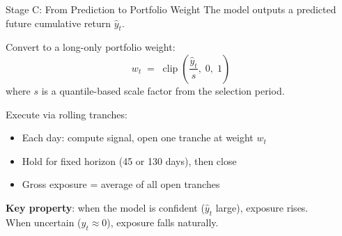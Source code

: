 \documentclass[aspectratio=169]{beamer}
\begin{document}
\begin{frame}{Stage C: From Prediction to Portfolio Weight}
  The model outputs a predicted future cumulative return \(\hat{y}_t\).

  \vspace{0.6em}
  Convert to a long-only portfolio weight:
  \[
    w_t \;=\; \operatorname{clip}\!\left(\frac{\hat{y}_t}{s},\; 0,\; 1\right)
  \]
  where \(s\) is a quantile-based scale factor from the selection period.

  \vspace{0.6em}
  Execute via rolling tranches:
  \begin{itemize}
    \item Each day: compute signal, open one tranche at weight \(w_t\)
    \item Hold for fixed horizon (45 or 130 days), then close
    \item Gross exposure = average of all open tranches
  \end{itemize}

  \vspace{0.5em}
  \textbf{Key property}: when the model is confident (\(\hat{y}_t\) large), exposure rises.\\
  When uncertain (\(\hat{y}_t \approx 0\)), exposure falls naturally.
\end{frame}
\end{document}
